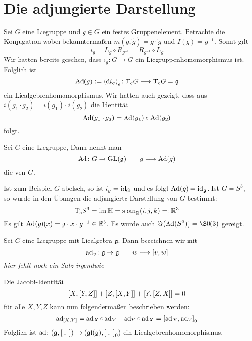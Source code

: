 \section{Die adjungierte Darstellung} %
\label{sec:15}
Sei $G$ eine Liegruppe und $g \in G$ ein festes Gruppenelement. Betrachte die Konjugation
wobei bekanntermaßen $m(g,\tilde{g})= g \cdot \tilde{g}$ und $I(g)=g^{-1}$. 
Somit gilt
\[
	i_g = L_g \circ R_{g^{-1}} = R_{g^{-1}} \circ L_g
\]
Wir hatten bereits gesehen, dass $i_g \colon G \to G$ ein Liegruppenhomomorphismus ist.
Folglich ist 
\[
	\Ad(g) := \enbrace*{\mathd i_g}_e \colon \Tmap_e G \longrightarrow \Tmap_eG = \mathfrak{g}
\]
ein Liealgebrenhomomorphismus.
Wir hatten auch gezeigt, dass aus $i(g_1 \cdot g_2) = i(g_1) \cdot i(g_2)$ die Identität 
\[
	\Ad(g_1 \cdot g_2) = \Ad(g_1) \circ \Ad(g_2)
\]
folgt.

\begin{definition}[{name=[adjungierte Darstellung]}]
	Sei $G$ eine Liegruppe,
	Dann nennt man 
	\[
		\Ad \colon G \to \GL(\mathfrak{g}) \qquad g \longmapsto \Ad(g)
	\]
	die  von $G$.
\end{definition}

Ist zum Beispiel $G$ abelsch, so ist $i_g = \id_G$ und es folgt ${\Ad(g)} = \id_{\mathfrak{g}}$.
Ist $G=S^3$, so wurde in den Übungen die adjungierte Darstellung von $G$ bestimmt:
\[
	\Tmap_e S^3 = \im \mathbb{H} = \Span_\mathbb{R} (i,j,k) =: \mathbb{R}^3
\]
Es gilt $\Ad(g)(x) = g \cdot x \cdot g^{-1} \in \mathbb{R}^3$.
Es wurde auch $\Im \enbrace*{\Ad(S^3)} = \S0(3)$ gezeigt.

\begin{definition}
	Sei $G$ eine Liegruppe mit Liealgebra $\mathfrak{g}$.
	Dann bezeichnen wir mit 
	\[
		\ad_v \colon \mathfrak{g} \to \mathfrak{g} \qquad w \longmapsto \benbrace*{v,w}
	\]
	\emph{hier fehlt noch ein Satz irgendwie}
\end{definition}

Die Jacobi-Identität 
\[
	\benbrace*{X,\benbrace*{Y,Z}} + \benbrace*{Z, \benbrace*{X,Y}} + \benbrace*{Y, \benbrace*{Z,X}} =0
\]
für alle $X,Y,Z$ kann nun folgendermaßen beschrieben werden:
\[
	\ad_{\benbrace*{X,Y}} = \ad_X \circ \ad_Y - \ad_Y \circ \ad_X = \benbrace*{\ad_X, \ad_Y}_0
\]
Folglich ist $\ad \colon \enbrace*{\mathfrak{g}, \benbrace*{\cdot ,\cdot }} \to \enbrace*{\mathfrak{gl}(\mathfrak{g}), \benbrace*{\cdot ,\cdot }_0}$
ein Liealgebrenhomomorphismus.

